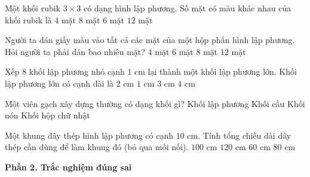 \begin{ex} %
Một khối rubik $3 \times 3$ có dạng hình lập phương. Số mặt có màu khác nhau của khối rubik là
\choice
{$4$ mặt}
{$8$ mặt}
{\True $6$ mặt}
{$12$ mặt}
\end{ex}

\begin{ex} %
Người ta dán giấy màu vào tất cả các mặt của một hộp phấn hình lập phương. Hỏi người ta phải dán bao nhiêu mặt?
\choice
{$4$ mặt}
{\True $6$ mặt}
{$8$ mặt}
{$12$ mặt}
\end{ex}

\begin{ex} %
Xếp 8 khối lập phương nhỏ cạnh $1\text{ cm}$ lại thành một khối lập phương lớn. Khối lập phương lớn có cạnh dài là
\choice
{\True $2\text{ cm}$}
{$1\text{ cm}$}
{$3\text{ cm}$}
{$4\text{ cm}$}
\end{ex}

\begin{ex} %
Một viên gạch xây dựng thường có dạng khối gì?
\choice
{Khối lập phương}
{Khối cầu}
{Khối nón}
{\True Khối hộp chữ nhật}
\end{ex}

\begin{ex} %
Một khung dây thép hình lập phương có cạnh $10\text{ cm}$. Tính tổng chiều dài dây thép cần dùng để làm khung đó (bỏ qua mối nối).
\choice
{$100\text{ cm}$}
{\True $120\text{ cm}$}
{$60\text{ cm}$}
{$80\text{ cm}$}
\end{ex}

\textbf{Phần 2. Trắc nghiệm đúng sai}

